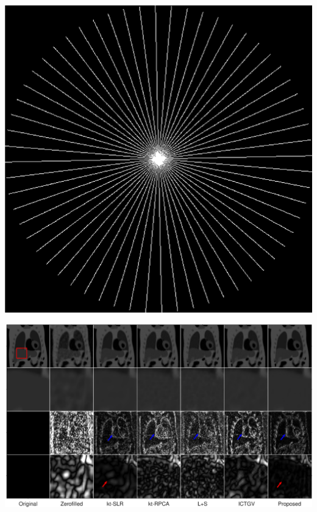 \documentclass{beamer}
\begin{document}
\begin{frame}
{\begin{minipage}{0.2\linewidth}
	\includegraphics[width=\textwidth]{../img/intro/pradial.eps}
\end{minipage}}
\end{frame}

\begin{frame}
\hspace{-0.7cm}
\begin{minipage}{1\textwidth}
	\centering
		\includegraphics[width=1.1\textwidth]{../img/tgvnn/figure2_pincat.eps}
\end{minipage}
\end{frame}
\end{document}
